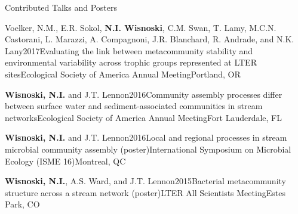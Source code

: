 \documentclass{resume} %
\begin{document}
\begin{rhangSection}{Contributed Talks and Posters}
  \begin{Presentation}{Voelker, N.M., E.R. Sokol, {\bf N.I. Wisnoski}, C.M. Swan, T. Lamy, M.C.N. Castorani, L. Marazzi, A. Compagnoni, J.R. Blanchard, R. Andrade, and N.K. Lany}{2017}{Evaluating the link between metacommunity stability and environmental variability across trophic groups represented at LTER sites}{Ecological Society of America Annual Meeting}{Portland, OR}
  \end{Presentation}

  \begin{Presentation}{{\bf Wisnoski, N.I.} and J.T. Lennon}{2016}{Community assembly processes differ between surface water and sediment-associated communities in stream networks}{Ecological Society of America Annual Meeting}{Fort Lauderdale, FL}
  \end{Presentation}

  \begin{Presentation}{{\bf Wisnoski, N.I.} and J.T. Lennon}{2016}{Local and regional processes in stream microbial community assembly (poster)}{International Symposium on Microbial Ecology (ISME 16)}{Montreal, QC}
  \end{Presentation}

  \begin{Presentation}{{\bf Wisnoski, N.I.}, A.S. Ward, and J.T. Lennon}{2015}{Bacterial metacommunity structure across a stream network (poster)}{LTER All Scientists Meeting}{Estes Park, CO}
  \end{Presentation}

\end{rhangSection}

\bigskip
\end{document}
